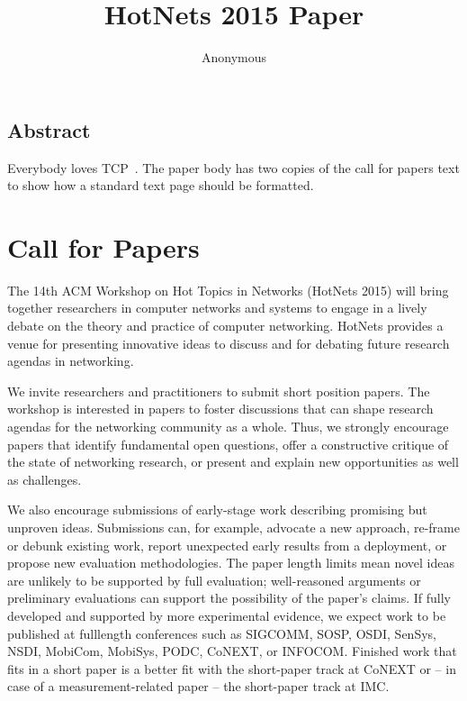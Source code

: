 \documentclass{hotnets15}
\begin{document}
 {}
\date{}


\title{HotNets 2015 Paper}

\author{Anonymous}

\maketitle


\subsection*{Abstract}

Everybody loves TCP~\cite{vanjacobson}. The paper body has two copies
of the call for papers text to show how a standard text page should be
formatted.

\section{Call for Papers}

The 14th ACM Workshop on Hot Topics in Networks (HotNets 2015) will
bring together researchers in computer networks and systems to engage
in a lively debate on the theory and practice of computer networking.
HotNets provides a venue for presenting innovative ideas to discuss
and for debating future research agendas in networking.

We invite researchers and practitioners to submit short position
papers. The workshop is interested in papers to foster discussions
that can shape research agendas for the networking community as a
whole. Thus, we strongly encourage papers that identify fundamental
open questions, offer a constructive critique of the state of
networking research, or present and explain new opportunities as well
as challenges.

We also encourage submissions of early-stage work describing promising
but unproven ideas. Submissions can, for example, advocate a new
approach, re-frame or debunk existing work, report unexpected early
results from a deployment, or propose new evaluation
methodologies. The paper length limits mean novel ideas are unlikely
to be supported by full evaluation; well-reasoned arguments or
preliminary evaluations can support the possibility of the paper's
claims. If fully developed and supported by more experimental
evidence, we expect work to be published at fulllength conferences
such as SIGCOMM, SOSP, OSDI, SenSys, NSDI, MobiCom, MobiSys, PODC,
CoNEXT, or INFOCOM. Finished work that fits in a short paper is a
better fit with the short-paper track at CoNEXT or -- in case of a
measurement-related paper -- the short-paper track at IMC.
\end{document}
